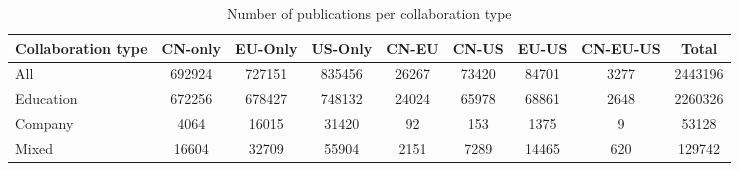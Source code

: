 \begin{table}[]
    \centering
    \begin{tabular}{lcccccccc}
    \hline
    \multicolumn{1}{c}{Collaboration type} & CN-only & EU-Only & US-Only & CN-EU & CN-US & EU-US & CN-EU-US & Total   \\ \hline
    All                                    & 692924  & 727151  & 835456  & 26267 & 73420 & 84701 & 3277     & 2443196 \\
    Education                              & 672256  & 678427  & 748132  & 24024 & 65978 & 68861 & 2648     & 2260326 \\
    Company                                & 4064    & 16015   & 31420   & 92    & 153   & 1375  & 9        & 53128   \\
    Mixed                                  & 16604   & 32709   & 55904   & 2151  & 7289  & 14465 & 620      & 129742  \\ \hline
    \end{tabular}
\caption{Number of publications per collaboration type}
\label{table:num_of_publications}
\end{table}
